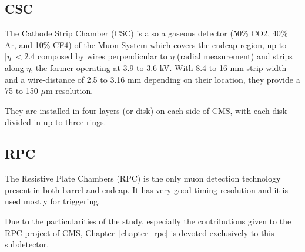 
\subsection{CSC}

The Cathode Strip Chamber (CSC) is also a gaseous detector (50\% CO2, 40\% Ar, and 10\% CF4) of the Muon System which covers the endcap region, up to $|\eta| < 2.4$ composed by wires perpendicular to $\eta$ (radial measurement) and strips along $\eta$, the former operating at 3.9 to 3.6 kV. With 8.4 to 16 mm strip width and a wire-distance of 2.5 to 3.16 mm depending on their location, they provide a 75 to 150 $\mu$m resolution.

They are installed in four layers (or disk) on each side of CMS, with each disk divided in up to three rings.


\subsection{RPC}

The Resistive Plate Chambers (RPC) is the only muon detection technology present in both barrel and endcap. It has very good timing resolution and it is used mostly for triggering.

Due to the particularities of the study, especially the contributions given to the RPC project of CMS, Chapter~\ref{chapter_rpc} is devoted exclusively to this subdetector.


